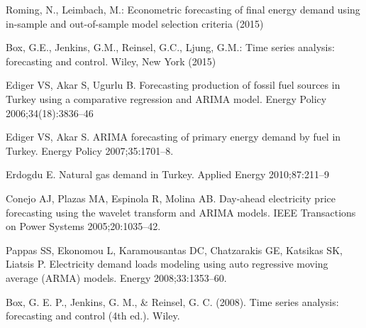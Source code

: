 \documentclass[lettersize,journal]{IEEEtran}
\begin{document}
\begin{thebibliography}{1}
  Roming, N., Leimbach, M.: Econometric forecasting of final energy demand using in-sample and out-of-sample model selection criteria (2015)

  Box, G.E., Jenkins, G.M., Reinsel, G.C., Ljung, G.M.: Time series analysis: forecasting and control. Wiley, New York (2015)

  Ediger VS, Akar S, Ugurlu B. Forecasting production of fossil fuel sources in Turkey using a comparative regression and ARIMA model. Energy Policy 2006;34(18):3836–46

  Ediger VS, Akar S. ARIMA forecasting of primary energy demand by fuel in Turkey. Energy Policy 2007;35:1701–8.

  Erdogdu E. Natural gas demand in Turkey. Applied Energy 2010;87:211–9

  Conejo AJ, Plazas MA, Espinola R, Molina AB. Day-ahead electricity price forecasting using the wavelet transform and ARIMA models. IEEE Transactions on Power Systems 2005;20:1035–42.

  Pappas SS, Ekonomou L, Karamousantas DC, Chatzarakis GE, Katsikas SK, Liatsis P. Electricity demand loads modeling using auto regressive moving average (ARMA) models. Energy 2008;33:1353–60.

  Box, G. E. P., Jenkins, G. M., \& Reinsel, G. C. (2008). Time series analysis: forecasting and control (4th ed.). Wiley.
\end{thebibliography}
\end{document}
